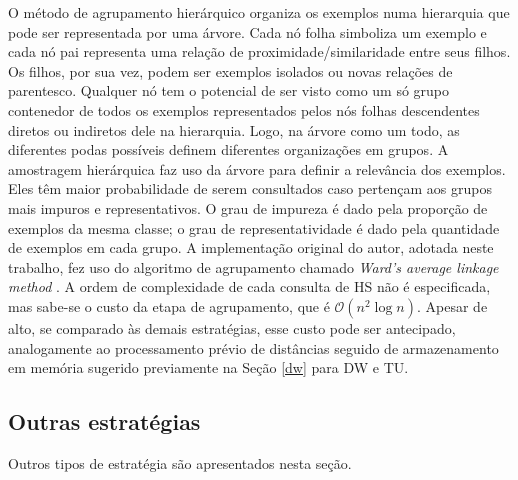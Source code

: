 O método de agrupamento hierárquico organiza os exemplos numa hierarquia que pode ser representada por uma árvore.
Cada nó folha simboliza um exemplo e cada nó pai representa uma relação de
proximidade/similaridade entre seus filhos.
Os filhos, por sua vez, podem ser exemplos isolados ou novas relações de parentesco.
Qualquer nó tem o potencial de ser visto como um só grupo contenedor de todos os exemplos representados pelos nós folhas descendentes diretos ou indiretos dele na hierarquia.
Logo, na árvore como um todo, as diferentes podas possíveis definem diferentes organizações em grupos.
A amostragem hierárquica faz uso da árvore para definir a relevância dos exemplos.
Eles têm maior probabilidade de serem consultados caso pertençam aos grupos
mais impuros e representativos.
O grau de impureza é dado pela proporção de exemplos da mesma classe; o grau de representatividade é dado pela quantidade de exemplos em cada grupo.
A implementação original do autor, adotada neste trabalho, fez uso do algoritmo de agrupamento chamado
\textit{Ward's average linkage method} \cite{journals/csur/JainMF99}.
A ordem de complexidade de cada consulta de HS não é especificada, mas sabe-se o custo da etapa de agrupamento, que é $\mathcal{O}(n^2 \log n)$.
Apesar de alto, se comparado às demais estratégias, esse custo pode ser antecipado, analogamente ao processamento prévio de distâncias seguido de armazenamento em memória sugerido previamente na Seção \ref{dw} para DW e TU.



\subsection{Outras estratégias}\label{outras}
Outros tipos de estratégia são apresentados nesta seção.

